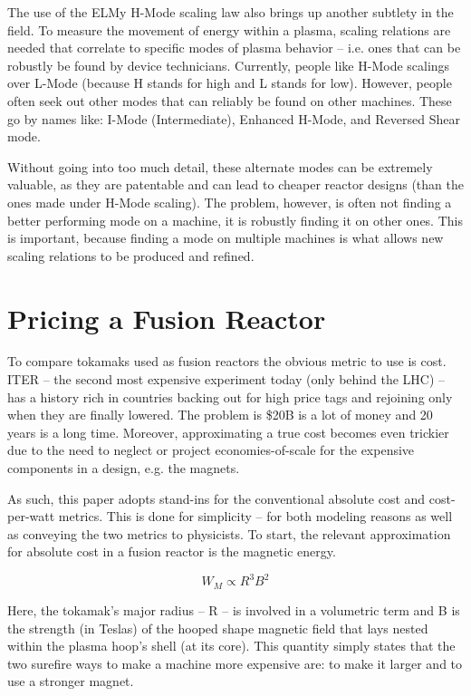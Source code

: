 The use of the ELMy H-Mode scaling law also brings up another subtlety in the field. To measure the movement of energy within a plasma, scaling relations are needed that correlate to specific modes of plasma behavior -- i.e. ones that can be robustly be found by device technicians. Currently, people like H-Mode scalings over L-Mode (because H stands for high and L stands for low). However, people often seek out other modes that can reliably be found on other machines. These go by names like: I-Mode (Intermediate), Enhanced H-Mode, and Reversed Shear mode. \cite{imode,enhanced,shear}

Without going into too much detail, these alternate modes can be extremely valuable, as they are patentable and can lead to cheaper reactor designs (than the ones made under H-Mode scaling). The problem, however, is often not finding a better performing mode on a machine, it is robustly finding it on other ones. This is important, because finding a mode on multiple machines is what allows new scaling relations to be produced and refined.

\section{Pricing a Fusion Reactor}

To compare tokamaks used as fusion reactors the obvious metric to use is cost. ITER -- the second most expensive experiment today (only behind the LHC) -- has a history rich in countries backing out for high price tags and rejoining only when they are finally lowered. \cite{jeff} The problem is \$20B is a lot of money and 20 years is a long time. Moreover, approximating a true cost becomes even trickier due to the need to neglect or project economies-of-scale for the expensive components in a design, e.g. the magnets.

As such, this paper adopts stand-ins for the conventional absolute cost and cost-per-watt metrics. This is done for simplicity -- for both modeling reasons as well as conveying the two metrics to physicists. To start, the relevant approximation for absolute cost in a fusion reactor is the magnetic energy. \cite{griffiths}

\begin{equation}
	W_M \propto R^3 B^2
\end{equation}

Here, the tokamak's major radius -- R -- is involved in a volumetric term and B is the strength (in Teslas) of the hooped shape magnetic field that lays nested within the plasma hoop's shell (at its core). This quantity simply states that the two surefire ways to make a machine more expensive are: to make it larger and to use a stronger magnet.

